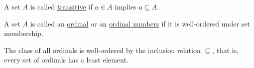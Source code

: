 \begin{definition}\label{def:transitive_set}\cite[71]{Enderton1977}
  A set $A$ is called \ul{transitive} if $a \in A$ implies $a \subseteq A$.
\end{definition}

\begin{definition}\label{def:ordinal}\cite[theorem 7L]{Enderton1977}
  A set $A$ is called an \ul{ordinal} or an \ul{ordinal numbers} if it is well-ordered under set membership.
\end{definition}

\begin{theorem}\label{thm:ordinals_are_well_ordered}\cite[theorem 7M]{Enderton1977}
  The class of all ordinals is well-ordered by the inclusion relation $\subseteq$, that is, every set of ordinals has a least element.
\end{theorem}

